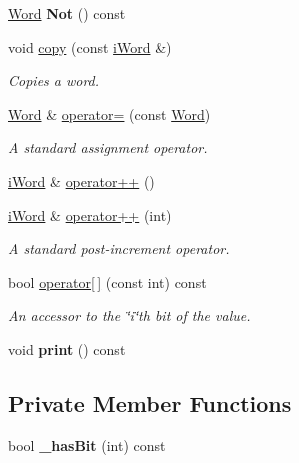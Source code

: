 \begin{DoxyCompactItemize}
\item 
\hypertarget{classWord_afdecfa9e3f2fda36496f249617a4cef5}{
\hyperlink{classWord}{Word} {\bfseries Not} () const }
\label{classWord_afdecfa9e3f2fda36496f249617a4cef5}

\item 
void \hyperlink{classWord_abb97142e332c7cc25d2a0c2bdb6c3d9b}{copy} (const \hyperlink{classiWord}{iWord} \&)
\begin{DoxyCompactList}\small\item\em Copies a word. \item\end{DoxyCompactList}\item 
\hyperlink{classWord}{Word} \& \hyperlink{classWord_a2ae41869cb0f1855fc18c6bce05f7c4d}{operator=} (const \hyperlink{classWord}{Word})
\begin{DoxyCompactList}\small\item\em A standard assignment operator. \item\end{DoxyCompactList}\item 
\hyperlink{classiWord}{iWord} \& \hyperlink{classWord_a3837f49bcb44597e6d738ccb0eeed144}{operator++} ()
\item 
\hyperlink{classiWord}{iWord} \& \hyperlink{classWord_ae921b75d263be790fd150c5962445163}{operator++} (int)
\begin{DoxyCompactList}\small\item\em A standard post-\/increment operator. \item\end{DoxyCompactList}\item 
bool \hyperlink{classWord_ab0f10ac1a0397559b859774b503538fe}{operator\mbox{[}$\,$\mbox{]}} (const int) const 
\begin{DoxyCompactList}\small\item\em An accessor to the \char`\"{}i\char`\"{}th bit of the value. \item\end{DoxyCompactList}\item 
\hypertarget{classWord_a7484e0f4d1fa712ca367539dad71dfa3}{
void {\bfseries print} () const }
\label{classWord_a7484e0f4d1fa712ca367539dad71dfa3}

\end{DoxyCompactItemize}
\subsection*{Private Member Functions}
\begin{DoxyCompactItemize}
\item 
\hypertarget{classWord_aaacae836ba9ed28f9725432ae81ab318}{
bool {\bfseries \_\-hasBit} (int) const }
\label{classWord_aaacae836ba9ed28f9725432ae81ab318}

\end{DoxyCompactItemize}
